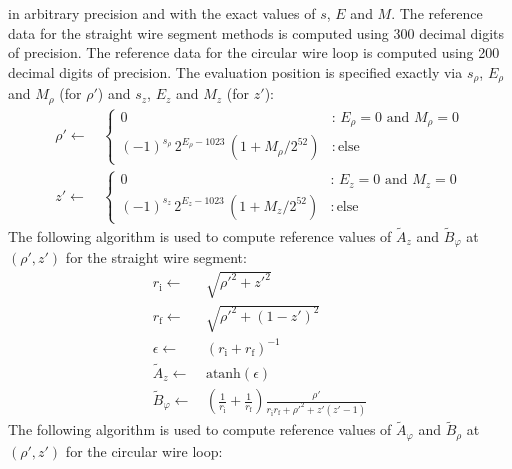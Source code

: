 in arbitrary precision and with the exact values of $s$, $E$ and $M$.
The reference data for the straight wire segment methods
is computed using 300 decimal digits of precision.
The reference data for the circular wire loop
is computed using 200 decimal digits of precision.
The evaluation position is specified exactly
via $s_\rho$, $E_\rho$ and $M_\rho$ (for $\rho'$)
and $s_z$, $E_z$ and $M_z$ (for $z'$):
\begin{align}
 \rho' \leftarrow&\, \begin{cases}
                       0  &:\, E_\rho = 0 \textrm{ and } M_\rho = 0 \\
                       (-1)^{s_\rho} \, 2^{E_\rho - 1023} \, \left(1 + M_\rho / 2^{52}  \right) &:\, \textrm{else}
                     \end{cases} \nonumber \\
    z' \leftarrow&\, \begin{cases}
                       0  &:\, E_z = 0 \textrm{ and } M_z = 0 \\
                       (-1)^{s_z   } \, 2^{E_z    - 1023} \, \left(1 + M_z / 2^{52}  \right) &:\, \textrm{else}
                     \end{cases} \nonumber
\end{align}
The following algorithm is used to compute reference values
of $\tilde{A}_z$ and $\tilde{B}_\varphi$ at~$(\rho', z')$
for the straight wire segment:
\begin{align}
  r_\mathrm{i}  \leftarrow&\, \sqrt{ {\rho'}^2 + {z'}^2 } \nonumber \\
  r_\mathrm{f}  \leftarrow&\, \sqrt{ {\rho'}^2 + \left(1 - z'\right)^2 } \nonumber \\
  \epsilon \leftarrow&\, \left( r_\mathrm{i} + r_\mathrm{f} \right)^{-1} \nonumber \\
  \tilde{A}_z \leftarrow&\, \textrm{atanh} (\epsilon) \label{eqn:sws_A_z_ref} \\
  \tilde{B}_\varphi \leftarrow&\, \left(\frac{1}{r_\mathrm{i}} + \frac{1}{r_\mathrm{f}} \right) \frac{\rho'}{r_\mathrm{i} r_\mathrm{f} + {\rho'}^2 + z' (z' - 1)} \label{eqn:sws_B_phi_ref}
\end{align}
The following algorithm is used to compute reference values
of $\tilde{A}_\varphi$ and $\tilde{B}_\rho$ at~$(\rho', z')$
for the circular wire loop:
